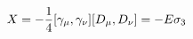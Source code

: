 \begin{equation}
  \label{eq:twodimX}
X = -{1 \over 4} [\gamma_\mu,\gamma_\nu] [D_\mu,D_\nu] = -E \sigma_3
\end{equation}

